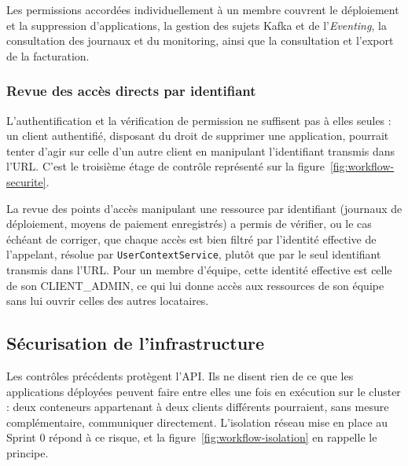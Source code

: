 Les permissions accordées individuellement à un membre couvrent le déploiement et la suppression d'applications, la gestion des sujets Kafka et de l'\textit{Eventing}, la consultation des journaux et du monitoring, ainsi que la consultation et l'export de la facturation.

\subsubsection{Revue des accès directs par identifiant}

L'authentification et la vérification de permission ne suffisent pas à elles seules : un client authentifié, disposant du droit de supprimer une application, pourrait tenter d'agir sur celle d'un autre client en manipulant l'identifiant transmis dans l'URL. C'est le troisième étage de contrôle représenté sur la figure~\ref{fig:workflow-securite}.

La revue des points d'accès manipulant une ressource par identifiant (journaux de déploiement, moyens de paiement enregistrés) a permis de vérifier, ou le cas échéant de corriger, que chaque accès est bien filtré par l'identité effective de l'appelant, résolue par \texttt{UserContextService}, plutôt que par le seul identifiant transmis dans l'URL. Pour un membre d'équipe, cette identité effective est celle de son CLIENT\_ADMIN, ce qui lui donne accès aux ressources de son équipe sans lui ouvrir celles des autres locataires.

\subsection{Sécurisation de l'infrastructure}

Les contrôles précédents protègent l'API. Ils ne disent rien de ce que les applications déployées peuvent faire entre elles une fois en exécution sur le cluster : deux conteneurs appartenant à deux clients différents pourraient, sans mesure complémentaire, communiquer directement. L'isolation réseau mise en place au Sprint 0 répond à ce risque, et la figure~\ref{fig:workflow-isolation} en rappelle le principe.

